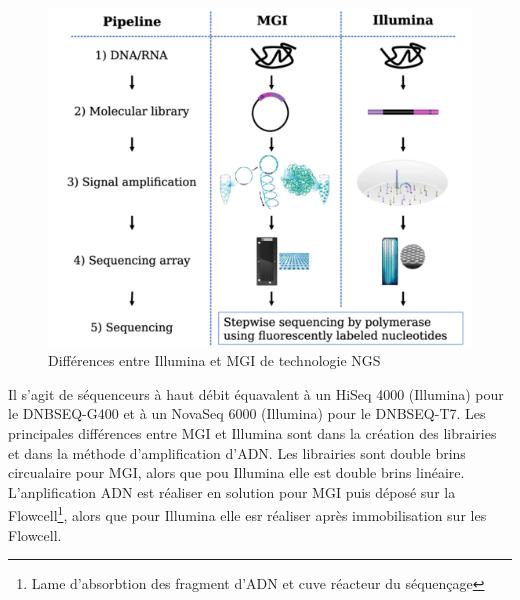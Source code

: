 
\begin{minipage}{0.45\textwidth}
	\begin{figure}[H]
        \centering
        \includegraphics[width=1\textwidth]{img/MGI_vs_Illumina.png}
        \caption{\footnotesize{Différences entre Illumina et MGI de technologie NGS}}
        \label{fig-Illu-vs-MGI}
    \end{figure}
\end{minipage} 
\hfill
\begin{minipage}{0.45\textwidth}
    Il s'agit de séquenceurs à haut débit équavalent à un HiSeq 4000 (Illumina) pour le DNBSEQ-G400 et à un NovaSeq 6000 (Illumina) pour le DNBSEQ-T7. Les principales différences entre MGI et Illumina sont dans la création des librairies et dans la méthode d'amplification d'ADN. Les librairies sont double brins circualaire pour MGI, alors que pou Illumina elle est double brins linéaire. L'anplification ADN est réaliser en solution pour MGI puis déposé sur la Flowcell\footnote{Lame d'absorbtion des fragment d'ADN et cuve réacteur du séquençage}, alors que pour Illumina elle esr réaliser après immobilisation sur les Flowcell.
\end{minipage}

